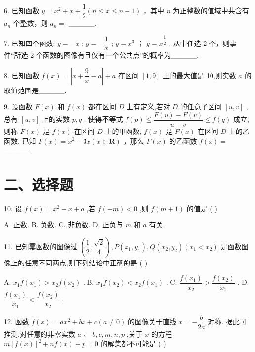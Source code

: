 6. 已知函数 $y = {x}^{2} + x + \dfrac{1}{2}\left( {n \leq  x \leq  n + 1}\right)$ ，其中 $n$ 为正整数的值域中共含有 ${a}_{n}$ 个整数，则 ${a}_{n} =$ \_\_\_\_\_.

7. 已知四个函数:   $y =  - x$ ;    $y =  - \dfrac{1}{x}$ ;    $y = {x}^{3}$ ；   $y = {x}^{\dfrac{1}{2}}$ . 从中任选 2 个，则事件“所选 2 个函数的图像有且仅有一个公共点”的概率为\_\_\_\_\_.

8. 已知函数 $f\left( x\right)  = \left| {x + \dfrac{9}{x} - a}\right|  + a$ 在区间 $\left\lbrack  {1,9}\right\rbrack$ 上的最大值是 10,则实数 $a$ 的取值范围是\_\_\_\_\_.

9. 设函数 $F\left( x\right)$ 和 $f\left( x\right)$ 都在区间 $D$ 上有定义,若对 $D$ 的任意子区间 $\left\lbrack  {u,v}\right\rbrack$ ,总有 $\left\lbrack  {u,v}\right\rbrack$ 上的实数 $p,q$ , 使得不等式 $f\left( p\right)  \leq  \dfrac{F\left( u\right)  - F\left( v\right) }{u - v} \leq  f\left( q\right)$ 成立,则称 $F\left( x\right)$ 是 $f\left( x\right)$ 在区间 $D$ 上的甲函数, $f\left( x\right)$ 是 $F\left( x\right)$ 在区间 $D$ 上的乙函数. 已知 $F\left( x\right)  = {x}^{2} - {3x}\left( {x \in  \mathbf{R}}\right)$ ，那么 $F\left( x\right)$ 的乙函数 $f\left( x\right)  =$ \_\_\_\_\_.

\section*{二、选择题}

10. 设 $f\left( x\right)  = {x}^{2} - x + a$ ,若 $f\left( {-m}\right)  < 0$ ,则 $f\left( {m + 1}\right)$ 的值是 ( )

A. 正数. B. 负数. C. 非负数. D. 正负与 $m$ 和 $a$ 有关.

11. 已知幂函数的图像过 $\left( {\dfrac{1}{2},\dfrac{\sqrt{2}}{4}}\right) ,P\left( {{x}_{1},{y}_{1}}\right) ,Q\left( {{x}_{2},{y}_{2}}\right) \left( {{x}_{1} < {x}_{2}}\right)$ 是函数图像上的任意不同两点,则下列结论中正确的是 ( )

A. ${x}_{1}f\left( {x}_{1}\right)  > {x}_{2}f\left( {x}_{2}\right)$ . B. ${x}_{1}f\left( {x}_{2}\right)  < {x}_{2}f\left( {x}_{1}\right)$ . C. $\dfrac{f\left( {x}_{1}\right) }{{x}_{2}} > \dfrac{f\left( {x}_{2}\right) }{{x}_{1}}$ . D. $\dfrac{f\left( {x}_{1}\right) }{{x}_{1}} < \dfrac{f\left( {x}_{2}\right) }{{x}_{2}}$ .

12. 函数 $f\left( x\right)  = a{x}^{2} + {bx} + c\left( {a \neq  0}\right)$ 的图像关于直线 $x =  - \dfrac{b}{2a}$ 对称. 据此可推测,对任意的非零实数 $a$ 、 $b,c,m,n,p$ ,关于 $x$ 的方程 $m{\left\lbrack  f\left( x\right) \right\rbrack  }^{2} + {nf}\left( x\right)  + p = 0$ 的解集都不可能是 ( )

